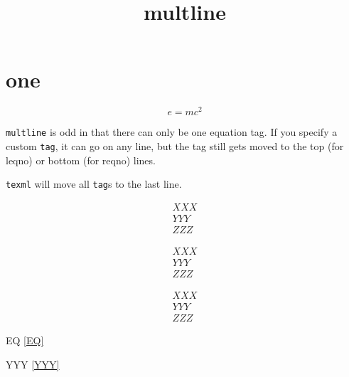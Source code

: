 \documentclass{amsart}
\title{multline}
\begin{document}
\maketitle

\section{one}


\begin{equation}\label{EQ}
e = mc^2
\end{equation}

\texttt{multline} is odd in that there can only be one equation tag.
If you specify a custom \texttt{tag}, it can go on any line, but the
tag still gets moved to the top (for leqno) or bottom (for reqno)
lines.

\texttt{texml} will move all \texttt{tag}s to the last line.

\begin{multline}
  XXX\tag{a}\\YYY\\ZZZ
\end{multline}

\begin{multline}
  XXX\\YYY\tag{b}\\ZZZ
\end{multline}

\begin{multline}
  XXX\\YYY\label{YYY}\\ZZZ\tag{c}
\end{multline}

EQ \eqref{EQ}

YYY \eqref{YYY}
\end{document}
